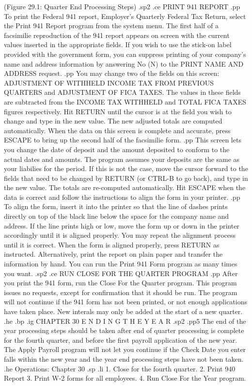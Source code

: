 	     (Figure 29.1: Quarter End Processing Steps)
.sp2
.ce
PRINT 941 REPORT
.pp
To print the Federal 941 report, Employer's Quarterly Federal Tax
Return, select the Print 941 Report program from the system menu.
The first half of a facsimilie reproduction of the 941 report
appears on screen with the current values inserted in the appropriate
fields.  If you wish to use the stick-on label provided with the
government form, you can suppress printing of your company's name and
address information by answering No (N) to the PRINT NAME AND ADDRESS
request.
.pp
You may change two of the fields on this screen:
ADJUSTMENT OF WITHHELD INCOME TAX FROM PREVIOUS QUARTERS and ADJUSTMENT
OF FICA TAXES.	The values in these fields are subtracted from the
INCOME TAX WITHHELD and TOTAL FICA TAXES figures respectively.
Hit RETURN until the cursor is at the field you wish to change and type
in the new value.  The new adjusted totals are computed automatically.
When the data on this screen is complete and accurate, press ESCAPE to
bring up the second half of the facsimilie form.
.pp
This screen lets you change the date of deposit and the amount
deposited to conform to the actual dates and amounts.  The program
assumes your deposits are the same as your liabilies for the period.
If this is not the case, move the cursor forward  to the fields that need to
be changed by RETURN (or CTRL-B to go back), and type in the new value.
The totals are re-computed automatically.  Hit ESCAPE when the data is
correct and follow the instructions to align the form in your printer.
.pp
To align the form, insert it into the printer so that the line of
dashes prints directly on top of the black
line below the space for the company name and address.	If the line
prints high or low, move the form up or down in the printer accordingly
until it is aligned properly.  You may repeat the alignment process
until it is correct.  When the form is aligned properly, press RETURN
as instructed.	Alternatively, print the report on plain paper and
transfer the information  by hand.
You can run the Print 941 Form program as many
times you want.
.sp2
.ce
RUN CLOSE FOR THE QUARTER PROGRAM
.pp
After you print the 941 form, run the Close For the Quarter program.
This program issues no requests, except for confirmation that it should
be run.  The program will not continue if the 941 form has not been
printed, or not enough applications have taken place.  New interals
may only be added at the start of a new quarter.
.he
.bp
.ig
CHAPTER 30
E N D I N G    T H E	Y E A R
.sp2
.pp5
The end of the year processing steps should be taken after end of
quarter processing is complete for the fourth quarter, and before
the first payroll application of the new year.	The Apply Payroll program
will not let you continue if the Check Date you enter falls within the
new year and the year end processing steps have not been taken.
.he Operations: Chapter 30
.sp
.li
		1. Close for the fourth quarter.
		2. Print 940 Report
		3. Print W-2 forms for all employees.
		4. Run Close For the Year program.

